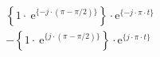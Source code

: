 \[
\begin{split}
& \left \{ 1\cdot\ \textrm{e}^{\{-j \cdot (\pi-\pi/2) \}} \right \} \cdot \textrm{e}^{\{- j \cdot \pi \cdot t \}}\\
&-\left \{ 1\cdot\ \textrm{e}^{\{ j \cdot (\pi-\pi/2) \}} \right \} \cdot \textrm{e}^{\{  j \cdot \pi \cdot t \}}
\end{split}
\]
